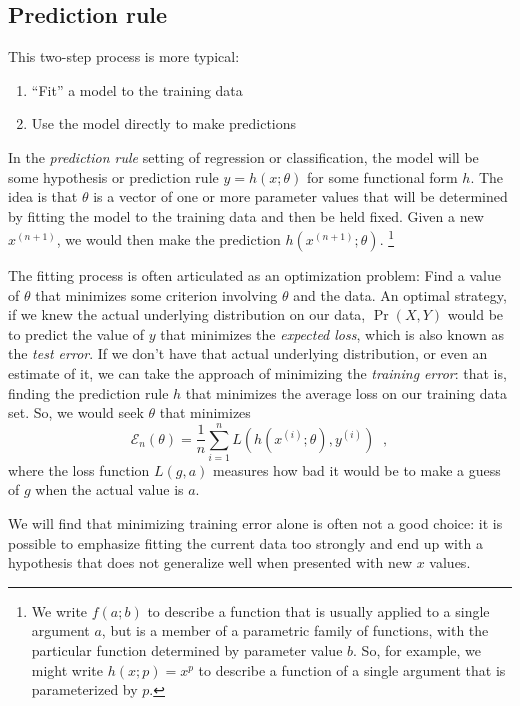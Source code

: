 \documentclass[11pt]{article}
\newcommand{\note}[1]{\todo[color=blue!10,
  linecolor=blue!90,size=\small]{\linespread{0.9}\selectfont{#1}\par}}
\renewcommand{\note}[1]{\footnote{#1}}
\newcommand\ex[2]{#1^{(#2)}}
\newcommand{\trainerr}{\mathcal{E}_n}
\begin{document}
\subsection{Prediction rule}

This two-step process is more typical:
\begin{enumerate}
\item ``Fit'' a model to the training data
\item Use the model directly to make predictions
\end{enumerate}

In the {\em prediction rule} setting of regression or classification, the
model will be some hypothesis or prediction rule $y = h(x ; \theta)$
for some functional form $h$.  The idea is that $\theta$ is a vector
of one or more parameter values that will be determined by fitting the
model to the training data and then be held fixed.  Given a new
$\ex{x}{n+1}$, we would then make the prediction $h(\ex{x}{n+1};
\theta)$.  \note{We write $f(a ; b)$ to describe a function that is
  usually applied to a single argument $a$, but is a member of a
  parametric family of functions, with the particular function
  determined by parameter value $b$.  So, for example, we might write
  $h(x ; p) = x^p$ to describe a function of a single argument that is
  parameterized by $p$.}

The fitting process is often articulated as an optimization problem:
Find a value of $\theta$ that minimizes some criterion involving
$\theta$ and the data.
An optimal strategy, if we knew the actual underlying distribution on
our data, $\Pr(X,Y)$ would be to predict the value of $y$ that
minimizes the {\em expected loss}, which is also known as the {\em
  test error}.  If we don't have that actual underlying distribution, or
even an estimate of it, we can take the approach of minimizing the
{\em training error}: that is, finding the prediction rule $h$ that
minimizes the average loss on our training data set.  So, we would
seek $\theta$ that minimizes
\[\trainerr(\theta) =  \frac{1}{n}\sum_{i = 1}^n
L(h(\ex{x}{i};\theta), \ex{y}{i})\;\;,\]
where the loss function $L(g, a)$ measures how bad it would be to make
a guess of $g$ when the actual value is $a$.

We will find that minimizing training error alone is often not a good
choice: it is possible to emphasize fitting the current data too
strongly and end up with a hypothesis that does not generalize well
when presented with new $x$ values.

\end{document}
